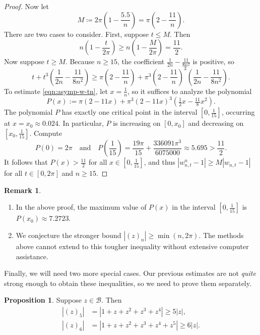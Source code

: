 \documentclass[11pt]{article}
\theoremstyle{definition}
\newtheorem{prop}{Proposition}
\newtheorem{remark}{Remark}
\newcommand{\calB}{\mathcal B}
\begin{document}
\begin{proof}
	Now let
	\[
	M\coloneqq 2\pi\left(1 - \frac{5.5}{n}\right) = \pi\left(2 - \frac{11}n\right).
	\]
	There are two cases to consider.  First, suppose $t\leq M$.  Then
	\[
	n\left(1 - \frac{t}{2\pi}\right) \geq n\left(1 - \frac{M}{2\pi}\right) = \frac{11}2.
	\]
	Now suppose $t\geq M$.  Because $n\geq 15$, the coefficient $\tfrac{1}{2n} - \tfrac{11}{8n^2}$ is positive, so
	\begin{equation}\label{eqn:asymp-w-tn}
		t + t^3\left(\frac{1}{2n} - \frac{11}{8n^2}\right) \geq \pi\left(2 - \frac{11}n\right) + \pi^3\left(2 - \frac{11}n\right)^3\left(\frac{1}{2n} - \frac{11}{8n^2}\right).
	\end{equation}
	To estimate \eqref{eqn:asymp-w-tn}, let $x = \tfrac 1n$, so it suffices to analyze the polynomial
	\[
	P(x) := \pi(2-11x) + \pi^3(2-11x)^3(\tfrac 12x - \tfrac{11}{8}x^2).
	\]
	The polynomial $P$ has exactly one critical point in the interval $[0,\tfrac 1{15}]$, occurring at $x = x_0 \approx 0.024$.  In particular, $P$ is increasing on $[0,x_0]$ and decreasing on $[x_0,\tfrac1{15}]$.  Compute
	\[
	P(0) = 2\pi\quad\text{and}\quad P\left(\frac 1{15}\right) = \frac{19 \pi }{15}+\frac{336091 \pi ^3}{6075000} \approx 5.695 > \frac{11}2.
	\]
	It follows that $P(x) > \tfrac{11}2$ for all $x\in[0,\tfrac{1}{15}]$, and thus $|w_{n,t}^n - 1| \geq M|w_{n,t}-1|$ for all $t\in[0,2\pi]$ and $n\geq 15$.  
\end{proof}

\begin{remark}
	\leavevmode
	\begin{enumerate}
		\item In the above proof, the maximum value of $P(x)$ in the interval $[0,\tfrac{1}{15}]$ is $P(x_0)\approx 7.2723$. 
		\item We conjecture the stronger bound $|(z)_n| \geq \min(n,2\pi)$.  The methods above cannot extend to this tougher inequality without extensive computer assistance.
	\end{enumerate}
\end{remark}

\par Finally, we will need two more special cases.  Our previous estimates are not \textit{quite} strong enough to obtain these inequalities, so we need to prove them separately.

\begin{prop}\label{prop:ineq-smallcases}
	Suppose $z\in \calB$.  Then
	\begin{align}
		|(z)_5| &= |1+z+z^2+z^3+z^4| \geq 5|z|,\label{eqn:min-5}\\
		|(z)_6| &= |1+z+z^2+z^3+z^4+z^5| \geq 6|z|.\label{eqn:min-6}
	\end{align}
\end{prop}
\end{document}
